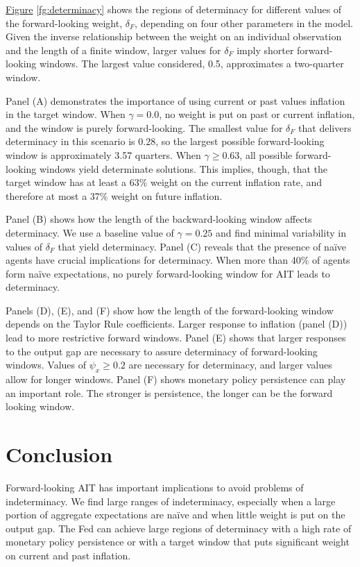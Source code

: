 \documentclass[english,authoryear,12pt]{elsarticle}
\begin{document}
\href{fg:determinacy}{Figure} \ref{fg:determinacy} shows the regions of determinacy for different values of the forward-looking weight, $\delta_F$, depending on four other parameters in the model. Given the inverse relationship between the weight on an individual observation and the length of a finite window, larger values for $\delta_F$ imply shorter forward-looking windows. The largest value considered, 0.5, approximates a two-quarter window.

Panel (A) demonstrates the importance of using current or past values inflation in the target window. When $\gamma=0.0$, no weight is put on past or current inflation, and the window is purely forward-looking. The smallest value for $\delta_F$ that delivers determinacy in this scenario is 0.28, so the largest possible forward-looking window is approximately 3.57 quarters. When $\gamma \geq 0.63$, all possible forward-looking windows yield determinate solutions. This implies, though, that the target window has at least a 63\% weight on the current inflation rate, and therefore at most a 37\% weight on future inflation.

Panel (B) shows how the length of the backward-looking window affects determinacy. We use a baseline value of $\gamma=0.25$ and find minimal variability in values of $\delta_F$ that yield determinacy. Panel (C) reveals that the presence of na\"ive agents have crucial implications for determinacy. When more than 40\% of agents form na\"ive expectations, no purely forward-looking window for AIT leads to determinacy.

Panels (D), (E), and (F) show how the length of the forward-looking window depends on the Taylor Rule coefficients. Larger response to inflation (panel (D)) lead to more restrictive forward windows. Panel (E) shows that larger responses to the output gap are necessary to assure determinacy of forward-looking windows. Values of $\psi_x \geq 0.2$ are necessary for determinacy, and larger values allow for longer windows.  Panel (F) shows monetary policy persistence can play an important role. The stronger is persistence, the longer can be the forward looking window.

\section{Conclusion}

Forward-looking AIT has important implications to avoid problems of indeterminacy. We find large ranges of indeterminacy, especially when a large portion of aggregate expectations are na\"ive and when little weight is put on the output gap. The Fed can achieve large regions of determinacy with a high rate of monetary policy persistence or with a target window that puts significant weight on current and past inflation. 



\end{document}
